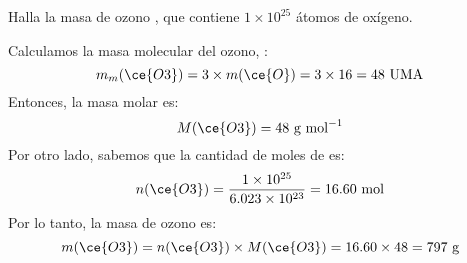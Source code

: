 Halla la masa de ozono , que contiene $1\times 10^{25}$ átomos de oxígeno.

\begin{solutionbox}{6.5cm}
    Calculamos la masa molecular del ozono, :
    \[ m_m(\ce{O3}) = 3 \times m(\ce{O}) = 3 \times 16 = 48 \text{ UMA} \]
    Entonces, la masa molar es:
    \[ M(\ce{O3}) = 48 \text{ g mol}^{-1} \]
    Por otro lado, sabemos que la cantidad de moles de  es:
    \[ n(\ce{O3}) = \frac{1\times 10^{25}}{6.023\times 10^{23}} = 16.60 \text{ mol} \]
    Por lo tanto, la masa de ozono es:
    \[ m(\ce{O3}) = n(\ce{O3}) \times M(\ce{O3}) = 16.60 \times 48 = 797 \text{ g} \]
\end{solutionbox}